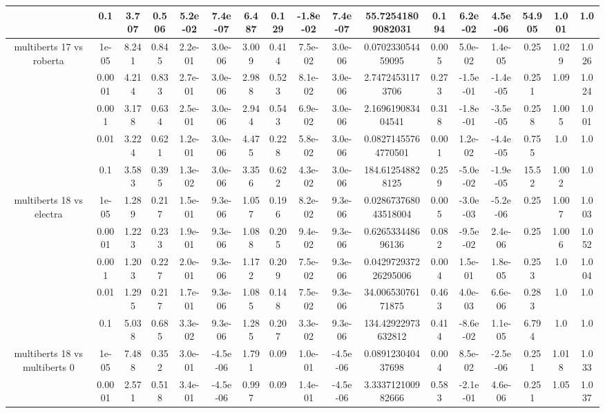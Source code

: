 \begin{tabular}{|c|c|c|c|c|c|c|c|c|c|c|c|c|c|c|c|c|}
 & 0.1 & 3.707 & 0.506 & 5.2e-02 & 7.4e-07 & 6.487 & 0.129 & -1.8e-02 & 7.4e-07 & 55.72541809082031 & 0.194 & 6.2e-02 & 4.5e-06 & 54.905 & 1.001 & 1.0 \\
\hline
\multirow{5}{*}{multiberts 17 vs roberta } & 1e-05 & 8.241 & 0.845 & 2.2e-01 & 3.0e-06 & 3.009 & 0.414 & 7.5e-02 & 3.0e-06 & 0.070233054459095 & 0.005 & 5.0e-02 & 1.4e-05 & 0.25 & 1.029 & 1.026 \\
 & 0.0001 & 4.214 & 0.833 & 2.7e-01 & 3.0e-06 & 2.988 & 0.523 & 8.1e-02 & 3.0e-06 & 2.74724531173706 & 0.273 & -1.5e-01 & -1.4e-05 & 0.251 & 1.09 & 1.024 \\
 & 0.001 & 3.178 & 0.634 & 2.5e-01 & 3.0e-06 & 2.944 & 0.543 & 6.9e-02 & 3.0e-06 & 2.169619083404541 & 0.318 & -1.8e-01 & -3.5e-05 & 0.258 & 1.005 & 1.001 \\
 & 0.01 & 3.224 & 0.621 & 1.2e-01 & 3.0e-06 & 4.475 & 0.228 & 5.8e-02 & 3.0e-06 & 0.08271455764770501 & 0.001 & 1.2e-02 & -4.4e-05 & 0.755 & 1.0 & 1.0 \\
 & 0.1 & 3.583 & 0.395 & 1.3e-02 & 3.0e-06 & 3.356 & 0.622 & 4.3e-02 & 3.0e-06 & 184.612548828125 & 0.259 & -5.0e-02 & -1.9e-05 & 15.52 & 1.002 & 1.0 \\
\hline
\multirow{5}{*}{multiberts 18 vs electra } & 1e-05 & 1.289 & 0.217 & 1.5e-01 & 9.3e-06 & 1.057 & 0.196 & 8.2e-02 & 9.3e-06 & 0.028673768043518004 & 0.005 & -3.0e-03 & -5.2e-06 & 0.25 & 1.007 & 1.003 \\
 & 0.0001 & 1.223 & 0.233 & 1.9e-01 & 9.3e-06 & 1.088 & 0.205 & 9.4e-02 & 9.3e-06 & 0.626533448696136 & 0.082 & -9.5e-02 & 2.4e-06 & 0.25 & 1.006 & 1.052 \\
 & 0.001 & 1.203 & 0.227 & 2.0e-01 & 9.3e-06 & 1.172 & 0.209 & 7.5e-02 & 9.3e-06 & 0.042972937226295006 & 0.004 & 1.5e-01 & 1.8e-05 & 0.253 & 1.0 & 1.004 \\
 & 0.01 & 1.295 & 0.217 & 1.7e-01 & 9.3e-06 & 1.085 & 0.148 & 7.5e-02 & 9.3e-06 & 34.00653076171875 & 0.463 & 4.0e-03 & 6.6e-06 & 0.283 & 1.0 & 1.0 \\
 & 0.1 & 5.038 & 0.685 & 3.3e-02 & 9.3e-06 & 1.285 & 0.207 & 3.3e-02 & 9.3e-06 & 134.42922973632812 & 0.414 & -8.6e-02 & 1.1e-05 & 6.794 & 1.0 & 1.0 \\
\hline
\multirow{5}{*}{multiberts 18 vs multiberts 0} & 1e-05 & 7.488 & 0.352 & 3.0e-01 & -4.5e-06 & 1.791 & 0.09 & 1.0e-01 & -4.5e-06 & 0.089123040437698 & 0.004 & 8.5e-02 & -2.5e-06 & 0.251 & 1.018 & 1.033 \\
 & 0.0001 & 2.571 & 0.518 & 3.4e-01 & -4.5e-06 & 0.997 & 0.09 & 1.4e-01 & -4.5e-06 & 3.333712100982666 & 0.583 & -2.1e-01 & 4.6e-06 & 0.251 & 1.05 & 1.037 \\

\end{tabular}
